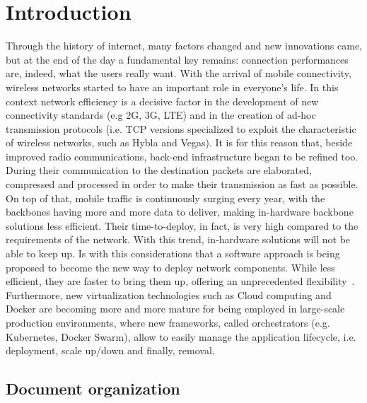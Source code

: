  
\chapter{Introduction}
\label{chap:intro}

 Through the history of internet, many factors changed and new innovations came,
 but at the end of the day a fundamental key remains: connection performances
 are, indeed, what the users really want. With the arrival of mobile
 connectivity, wireless networks started to have an important role in everyone's
 life. In this context network efficiency is a decisive factor in the
 development of new connectivity standards (e.g 2G, 3G, LTE) and in the creation
 of ad-hoc transmission protocols (i.e. TCP versions specialized to exploit the
 characteristic of wireless networks, such as Hybla and Vegas). It is for this
 reason that, beside improved radio communications, back-end infrastructure
 began to be refined too. During their communication to the destination packets
 are elaborated, compressed and processed in order to make their transmission as
 fast as possible. On top of that, mobile traffic is continuously surging every
 year, with the backbones having more and more data to deliver, making
 in-hardware backbone solutions less efficient. Their time-to-deploy, in fact,
 is very high compared to the requirements of the network. With this trend,
 in-hardware solutions will not be able to keep up. Is with this considerations
 that a software approach is being proposed to become the new way to deploy
 network components. While less efficient, they are faster to bring them up,
 offering an unprecedented flexibility~\cite{nguyen2017sdn}. Furthermore, new
 virtualization technologies such as Cloud computing and Docker are becoming
 more and more mature for being employed in large-scale production environments,
 where new frameworks, called orchestrators (e.g. Kubernetes, Docker Swarm),
 allow to easily manage the application lifecycle, i.e. deployment, scale
 up/down and finally, removal.

 \newpage
 
 \section{Document organization}
 
